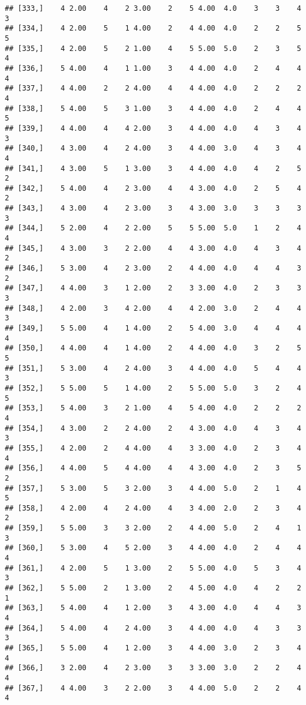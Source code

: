 \documentclass[]{article}
\begin{document}
\begin{verbatim}
## [333,]    4 2.00    4    2 3.00    2    5 4.00  4.0    3    3    4    3
## [334,]    4 2.00    5    1 4.00    2    4 4.00  4.0    2    2    5    5
## [335,]    4 2.00    5    2 1.00    4    5 5.00  5.0    2    3    5    4
## [336,]    5 4.00    4    1 1.00    3    4 4.00  4.0    2    4    4    4
## [337,]    4 4.00    2    2 4.00    4    4 4.00  4.0    2    2    2    4
## [338,]    5 4.00    5    3 1.00    3    4 4.00  4.0    2    4    4    5
## [339,]    4 4.00    4    4 2.00    3    4 4.00  4.0    4    3    4    3
## [340,]    4 3.00    4    2 4.00    3    4 4.00  3.0    4    3    4    4
## [341,]    4 3.00    5    1 3.00    3    4 4.00  4.0    4    2    5    2
## [342,]    5 4.00    4    2 3.00    4    4 3.00  4.0    2    5    4    2
## [343,]    4 3.00    4    2 3.00    3    4 3.00  3.0    3    3    3    3
## [344,]    5 2.00    4    2 2.00    5    5 5.00  5.0    1    2    4    4
## [345,]    4 3.00    3    2 2.00    4    4 3.00  4.0    4    3    4    2
## [346,]    5 3.00    4    2 3.00    2    4 4.00  4.0    4    4    3    2
## [347,]    4 4.00    3    1 2.00    2    3 3.00  4.0    2    3    3    3
## [348,]    4 2.00    3    4 2.00    4    4 2.00  3.0    2    4    4    3
## [349,]    5 5.00    4    1 4.00    2    5 4.00  3.0    4    4    4    4
## [350,]    4 4.00    4    1 4.00    2    4 4.00  4.0    3    2    5    5
## [351,]    5 3.00    4    2 4.00    3    4 4.00  4.0    5    4    4    3
## [352,]    5 5.00    5    1 4.00    2    5 5.00  5.0    3    2    4    5
## [353,]    5 4.00    3    2 1.00    4    5 4.00  4.0    2    2    2    4
## [354,]    4 3.00    2    2 4.00    2    4 3.00  4.0    4    3    4    3
## [355,]    4 2.00    2    4 4.00    4    3 3.00  4.0    2    3    4    4
## [356,]    4 4.00    5    4 4.00    4    4 3.00  4.0    2    3    5    2
## [357,]    5 3.00    5    3 2.00    3    4 4.00  5.0    2    1    4    5
## [358,]    4 2.00    4    2 4.00    4    3 4.00  2.0    2    3    4    2
## [359,]    5 5.00    3    3 2.00    2    4 4.00  5.0    2    4    1    3
## [360,]    5 3.00    4    5 2.00    3    4 4.00  4.0    2    4    4    4
## [361,]    4 2.00    5    1 3.00    2    5 5.00  4.0    5    3    4    3
## [362,]    5 5.00    2    1 3.00    2    4 5.00  4.0    4    2    2    1
## [363,]    5 4.00    4    1 2.00    3    4 3.00  4.0    4    4    3    4
## [364,]    5 4.00    4    2 4.00    3    4 4.00  4.0    4    3    3    3
## [365,]    5 5.00    4    1 2.00    3    4 4.00  3.0    2    3    4    4
## [366,]    3 2.00    4    2 3.00    3    3 3.00  3.0    2    2    4    4
## [367,]    4 4.00    3    2 2.00    3    4 4.00  5.0    2    2    4    4

\end{verbatim}
\end{document}
